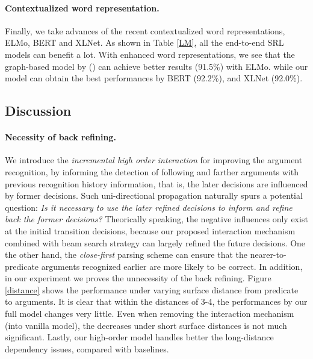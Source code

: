 \documentclass[letterpaper]{article} %
\begin{document}
\begin{CJK}{UTF8}{gbsn}
\paragraph{Contextualized word representation.}
Finally, we take advances of the recent contextualized word representations, ELMo, BERT and XLNet.
As shown in Table \ref{LM}, all the end-to-end SRL models can benefit a lot.
With enhanced word representations, we see that the graph-based model by \citeauthor{LiHZZZZZ19} (\citeyear{LiHZZZZZ19}) can achieve better results (91.5\%) with ELMo.
while our model can obtain the best performances by BERT (92.2\%), and XLNet (92.0\%).







\subsection{Discussion}


\paragraph{Necessity of back refining.}


We introduce the \emph{incremental high order interaction} for improving the argument recognition, by informing the detection of following and farther arguments with previous recognition history information, that is, the later decisions are influenced by former decisions.
Such uni-directional propagation naturally spurs a potential question:
\emph{Is it necessary to use the later refined decisions to inform and refine back the former decisions?}
Theorically speaking, the negative influences only exist at the initial transition decisions, because our proposed interaction mechanism combined with beam search strategy can largely refined the future decisions.
One the other hand, the \emph{close-first} parsing scheme can ensure that the nearer-to-predicate arguments recognized earlier are more likely to be correct.
In addition, in our experiment we proves the unnecessity of the back refining.
Figure \ref{distance} shows the performance under varying surface distance from predicate to arguments.
It is clear that within the distances of 3-4, the performances by our full model changes very little.
Even when removing the interaction mechanism (into vanilla model), the decreases under short surface distances is not much significant.
Lastly, our high-order model handles better the long-distance dependency issues, compared with baselines.













\end{CJK}
\end{document}

